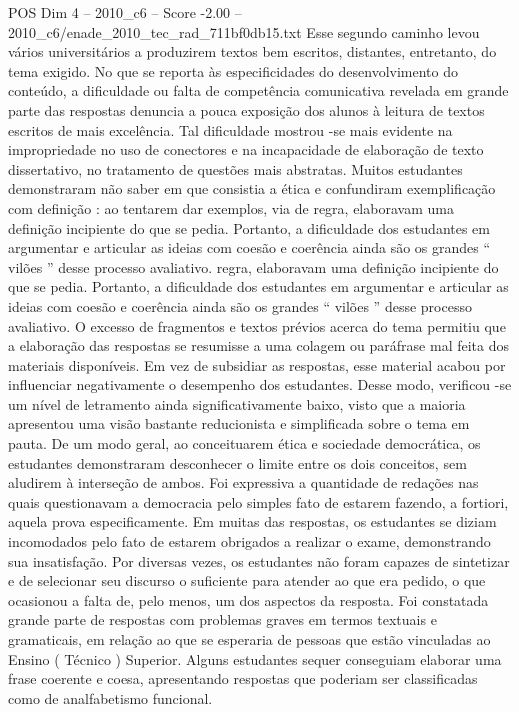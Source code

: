 \begin{textsample}{POS Dim 4 – 2010\_c6 – Score -2.00 – 2010\_c6/enade\_2010\_tec\_rad\_711bf0db15.txt}
Esse segundo caminho levou vários universitários a produzirem textos bem escritos, distantes, entretanto, do tema exigido.
No que se reporta às especificidades do desenvolvimento do conteúdo, a dificuldade ou falta de competência comunicativa revelada em grande parte das respostas denuncia a pouca exposição dos alunos à leitura de textos escritos de mais excelência.
Tal dificuldade mostrou -se mais evidente na impropriedade no uso de conectores e na incapacidade de elaboração de texto dissertativo, no tratamento de questões mais abstratas.
Muitos estudantes demonstraram não saber em que consistia a ética e confundiram exemplificação com definição : ao tentarem dar exemplos, via de regra, elaboravam uma definição incipiente do que se pedia.
Portanto, a dificuldade dos estudantes em argumentar e articular as ideias com coesão e coerência ainda são os grandes “ vilões ” desse processo avaliativo. regra, elaboravam uma definição incipiente do que se pedia.
Portanto, a dificuldade dos estudantes em argumentar e articular as ideias com coesão e coerência ainda são os grandes “ vilões ” desse processo avaliativo.
O excesso de fragmentos e textos prévios acerca do tema permitiu que a elaboração das respostas se resumisse a uma colagem ou paráfrase mal feita dos materiais disponíveis.
Em vez de subsidiar as respostas, esse material acabou por influenciar negativamente o desempenho dos estudantes.
Desse modo, verificou -se um nível de letramento ainda significativamente baixo, visto que a maioria apresentou uma visão bastante reducionista e simplificada sobre o tema em pauta.
De um modo geral, ao conceituarem ética e sociedade democrática, os estudantes demonstraram desconhecer o limite entre os dois conceitos, sem aludirem à interseção de ambos.
Foi expressiva a quantidade de redações nas quais questionavam a democracia pelo simples fato de estarem fazendo, a fortiori, aquela prova especificamente.
Em muitas das respostas, os estudantes se diziam incomodados pelo fato de estarem obrigados a realizar o exame, demonstrando sua insatisfação.
Por diversas vezes, os estudantes não foram capazes de sintetizar e de selecionar seu discurso o suficiente para atender ao que era pedido, o que ocasionou a falta de, pelo menos, um dos aspectos da resposta.
Foi constatada grande parte de respostas com problemas graves em termos textuais e gramaticais, em relação ao que se esperaria de pessoas que estão vinculadas ao Ensino ( Técnico ) Superior.
Alguns estudantes sequer conseguiam elaborar uma frase coerente e coesa, apresentando respostas que poderiam ser classificadas como de analfabetismo funcional.

\end{textsample}
